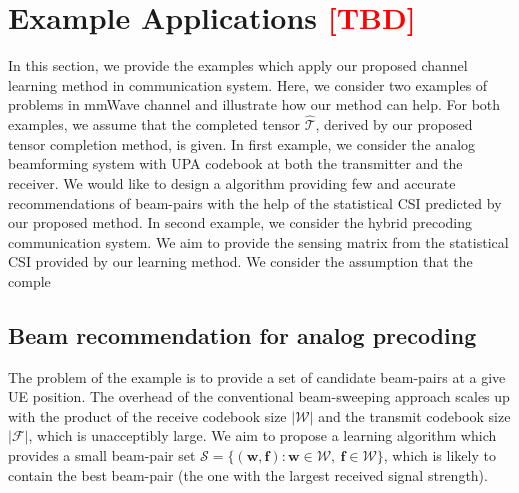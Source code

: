 \documentclass[12pt, draftcls, onecolumn]{IEEEtran}
\theoremstyle{plain}
\theoremstyle{definition}
\theoremstyle{remark}
\newcommand{\nt}[1]{\textcolor{red}{\textbf{[#1]}}}
\begin{document}
\section{Example Applications \nt{TBD}}
\label{sec4}
In this section, we provide the examples which apply our proposed channel learning method in communication system.
Here, we consider two examples of problems in mmWave channel and illustrate how our method can help.
For both examples, we assume that the completed tensor $\mathcal{\hat T}$, derived by our proposed tensor completion method, is given.
In first example, we consider the analog beamforming system with UPA codebook at both the transmitter and the receiver.
We would like to design a algorithm providing few and accurate recommendations of beam-pairs with the help of the statistical CSI predicted by our proposed method.
In second example, we consider the hybrid precoding communication system.
We aim to provide the sensing matrix from the statistical CSI provided by our learning method.
We consider the assumption that the comple

\subsection{Beam recommendation for analog precoding}
The problem of the example is to provide a set of candidate beam-pairs at a give UE position.
The overhead of the conventional beam-sweeping approach scales up with the product of the receive codebook size $\vert\mathcal W\vert$ and the transmit codebook size $\vert \mathcal F\vert$, which is unacceptibly large.
We aim to propose a learning algorithm which provides a small beam-pair set $\mathcal S=\{(\mathbf{w},\mathbf{f}):\mathbf{w}\in \mathcal{W},\ \mathbf{f}\in\mathcal{W}\}$, which is likely to contain the best beam-pair (the one with the largest received signal strength).
\end{document}
